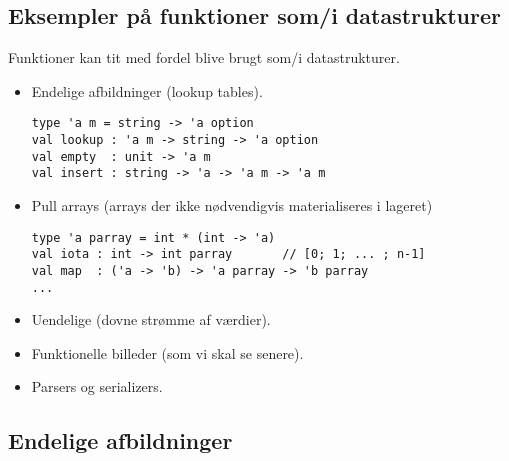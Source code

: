 \documentclass[rgb]{beamer}
\begin{document}
\subsection{Eksempler på funktioner som/i datastrukturer}
\begin{frame}[fragile]
\begin{footnotesize}


  Funktioner kan tit med fordel blive brugt som/i datastrukturer.


  \begin{itemize}
  \item Endelige afbildninger (lookup tables).
\begin{lstlisting}[numbers=none,mathescape]
type 'a m = string -> 'a option
val lookup : 'a m -> string -> 'a option
val empty  : unit -> 'a m
val insert : string -> 'a -> 'a m -> 'a m
\end{lstlisting}
  \item Pull arrays (arrays der ikke nødvendigvis materialiseres i lageret)
\begin{lstlisting}[numbers=none,mathescape]
type 'a parray = int * (int -> 'a)
val iota : int -> int parray       // [0; 1; ... ; n-1]
val map  : ('a -> 'b) -> 'a parray -> 'b parray
...
\end{lstlisting}

  \item Uendelige (dovne strømme af værdier).
  \item Funktionelle billeder (som vi skal se senere).
  \item Parsers og serializers.
  \end{itemize}

\end{footnotesize}
\end{frame}

\subsection{Endelige afbildninger}
\end{document}
